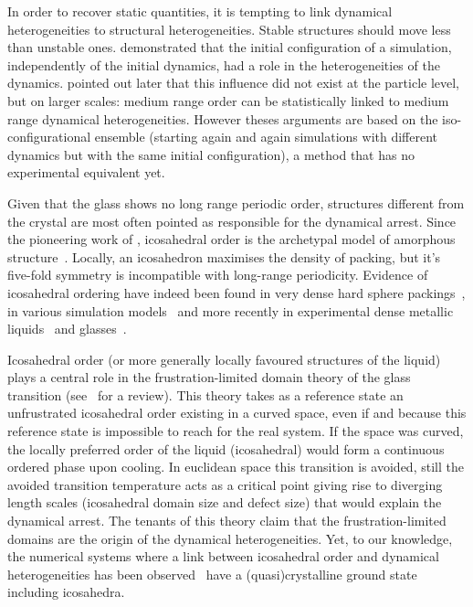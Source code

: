 \documentclass{revtex4-1}
\begin{document}
In order to recover static quantities, it is tempting to link dynamical heterogeneities to structural heterogeneities. Stable structures should move less than unstable ones. \citet{Widmer-Cooper2005} demonstrated that the initial configuration of a simulation, independently of the initial dynamics, had a role in the heterogeneities of the dynamics. \citet{Berthier2007} pointed out later that this influence did not exist at the particle level, but on larger scales: medium range order can be statistically linked to medium range dynamical heterogeneities. However theses arguments are based on the iso-configurational ensemble (starting again and again simulations with different dynamics but with the same initial configuration), a method that has no experimental equivalent yet.

Given that the glass shows no long range periodic order, structures different from the crystal are most often pointed as responsible for the dynamical arrest. Since the pioneering work of \citet{Frank1952}, icosahedral order is the archetypal model of amorphous structure~\citep{Spaepen2000}. Locally, an icosahedron maximises the density of packing, but it's five-fold symmetry is incompatible with long-range periodicity. Evidence of icosahedral ordering have indeed been found in very dense hard sphere packings~\citep{Bernal1960, Clarke1993, Malshe2011}, in various simulation models~\citep{steinhardt1983boo, Tomida1995, Doye2003, Coslovich2007, Pedersen2010, Coslovich2011} and more recently in experimental dense metallic liquids~\citep{Reichert2000, Celino2007} and glasses~\citep{Luo2004, Wang2011}.

Icosahedral order (or more generally locally favoured structures of the liquid) plays a central role in the frustration-limited domain theory of the glass transition (see~\citep{tarjus2005fba} for a review). This theory takes as a reference state an unfrustrated icosahedral order existing in a curved space, even if and because this reference state is impossible to reach for the real system. If the space was curved, the locally preferred order of the liquid (icosahedral) would form a continuous ordered phase upon cooling. In euclidean space this transition is avoided, still the avoided transition temperature acts as a critical point giving rise to diverging length scales (icosahedral domain size and defect size) that would explain the dynamical arrest. The tenants of this theory claim that the frustration-limited domains are the origin of the dynamical heterogeneities. Yet, to our knowledge, the numerical systems where a link between icosahedral order and dynamical heterogeneities has been observed~\citep{Dzugutov2002, Doye2003, Coslovich2007, Pedersen2010, Coslovich2011} have a (quasi)crystalline ground state including icosahedra.
\end{document}
